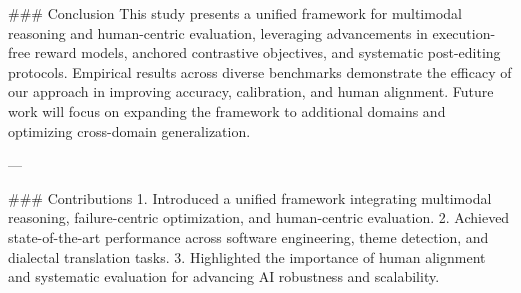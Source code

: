 ### Conclusion  
This study presents a unified framework for multimodal reasoning and human-centric evaluation, leveraging advancements in execution-free reward models, anchored contrastive objectives, and systematic post-editing protocols. Empirical results across diverse benchmarks demonstrate the efficacy of our approach in improving accuracy, calibration, and human alignment. Future work will focus on expanding the framework to additional domains and optimizing cross-domain generalization.

---

### Contributions  
1. Introduced a unified framework integrating multimodal reasoning, failure-centric optimization, and human-centric evaluation.
2. Achieved state-of-the-art performance across software engineering, theme detection, and dialectal translation tasks.
3. Highlighted the importance of human alignment and systematic evaluation for advancing AI robustness and scalability.  

